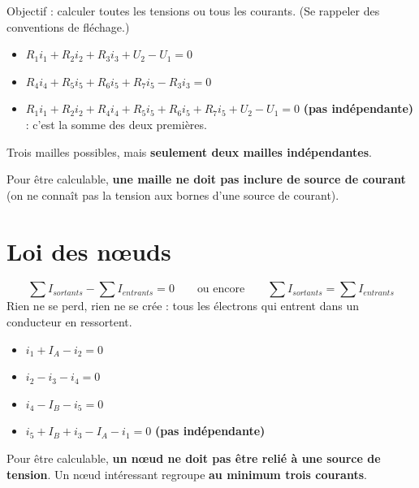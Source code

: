 \begin{exbox}[title=Mailles du circuit de la diapositive]
Objectif : calculer toutes les tensions ou tous les courants. (Se rappeler des
conventions de fléchage.)
\begin{itemize}
  \item $R_1 i_1 + R_2 i_2 + R_3 i_3 + U_2 - U_1 = 0$
  \item $R_4 i_4 + R_5 i_5 + R_6 i_5 + R_7 i_5 - R_3 i_3 = 0$
  \item $R_1 i_1 + R_2 i_2 + R_4 i_4 + R_5 i_5 + R_6 i_5 + R_7 i_5 + U_2 - U_1 = 0$
        \textbf{(pas indépendante)} : c'est la somme des deux premières.
\end{itemize}
Trois mailles possibles, mais \textbf{seulement deux mailles indépendantes}.
\end{exbox}

\begin{warnbox}[title=Attention]
Pour être calculable, \textbf{une maille ne doit pas inclure de source de courant} (on ne
connaît pas la tension aux bornes d'une source de courant).
\end{warnbox}

\section{Loi des n\oe uds}


\begin{thmbox}[title={Loi des n\oe uds}]
\[ \sum I_{sortants} - \sum I_{entrants} = 0 \qquad\text{ou encore}\qquad
   \sum I_{sortants} = \sum I_{entrants} \]
\og Rien ne se perd, rien ne se crée\fg{} : tous les électrons qui entrent dans un
conducteur en ressortent.
\end{thmbox}

\begin{exbox}[title={N\oe uds du même circuit}]
\begin{itemize}
  \item $i_1 + I_A - i_2 = 0$
  \item $i_2 - i_3 - i_4 = 0$
  \item $i_4 - I_B - i_5 = 0$
  \item $i_5 + I_B + i_3 - I_A - i_1 = 0$ \textbf{(pas indépendante)}
\end{itemize}
\end{exbox}

\begin{warnbox}[title=Attention]
Pour être calculable, \textbf{un n\oe ud ne doit pas être relié à une source de tension}. Un
n\oe ud intéressant regroupe \textbf{au minimum trois courants}.
\end{warnbox}

